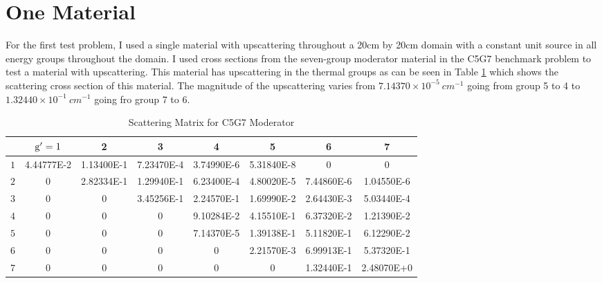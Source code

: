 \section{One Material}
For the first test problem, I used a single material with upscattering throughout a 20cm by 20cm domain with a constant unit source in all energy groups throughout the domain. 
 I used cross sections from the seven-group moderator material in the C5G7 benchmark problem \cite{C5G7} to test a material with upscattering.  This material has upscattering in the thermal groups as can be seen in Table \ref{table:modxs} which shows the scattering cross section of this material. The magnitude of the upscattering varies from $7.14370 \times 10^{-5} \: cm^{-1}$ going from group 5 to 4 to $1.32440 \times 10^{-1} \: cm^{-1}$ going fro group 7 to 6. 
 \begin{table}[!htb]
\footnotesize
\centering
\caption{Scattering Matrix for C5G7 Moderator}
\begin{center}
    \begin{tabular}{|c|c|c|c|c|c|c|c|}
\hline
 & $\mathrm{g}'=1$ & 2 & 3 & 4 & 5 & 6 & 7 \\ 
\hline
 $1$ & 4.44777E-2 &  1.13400E-1 & 7.23470E-4 & 3.74990E-6 & 5.31840E-8     &  0     &    0  \\
\hline
 $2$  & 0       &    2.82334E-1 & 1.29940E-1 & 6.23400E-4  & 4.80020E-5  & 7.44860E-6 &  1.04550E-6 \\
\hline
 $3$  & 0        &      0  &     3.45256E-1 & 2.24570E-1 & 1.69990E-2 & 2.64430E-3 & 5.03440E-4 \\
\hline
 $4$  & 0          &     0    &       0     &  9.10284E-2 & 4.15510E-1 & 6.37320E-2 & 1.21390E-2 \\
\hline
 $5$  & 0        &       0     &      0     & 7.14370E-5 & 1.39138E-1 & 5.11820E-1 & 6.12290E-2 \\
\hline
$6$  & 0        &       0   &    0      &  0     &  2.21570E-3 & 6.99913E-1 &  5.37320E-1 \\
\hline
$7$  & 0       &        0        &   0      &     0      &     0   &    1.32440E-1 & 2.48070E+0 \\
\hline
    \end{tabular}
\end{center}
\label{table:modxs}
\end{table}

